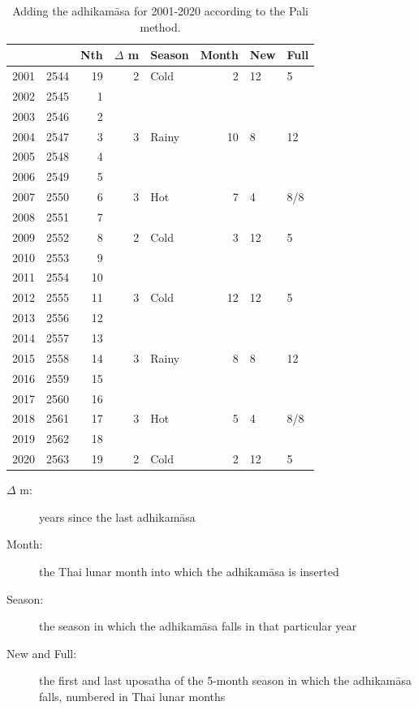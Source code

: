 \documentclass[11pt,oneside]{memoir-article}
\begin{document}
\begin{table}[h]
\caption{\label{tbl-adhikamasa-pali} Adding the adhikamāsa for 2001-2020 according to the Pali method.}
\centering
\begin{tabular}{rrrrlrll}
 &  & Nth & $\Delta$ m & Season & Month & New & Full\\
\hline
2001 & 2544 & 19 & 2 & Cold & 2 & \mN{} 12 & \mF{} 5\\
2002 & 2545 & 1 &  &  &  &  & \\
2003 & 2546 & 2 &  &  &  &  & \\
2004 & 2547 & 3 & 3 & Rainy & 10 & \mN{} 8 & \mF{} 12\\
2005 & 2548 & 4 &  &  &  &  & \\
2006 & 2549 & 5 &  &  &  &  & \\
2007 & 2550 & 6 & 3 & Hot & 7 & \mN{} 4 & \mF{} 8/8\\
2008 & 2551 & 7 &  &  &  &  & \\
2009 & 2552 & 8 & 2 & Cold & 3 & \mN{} 12 & \mF{} 5\\
2010 & 2553 & 9 &  &  &  &  & \\
2011 & 2554 & 10 &  &  &  &  & \\
2012 & 2555 & 11 & 3 & Cold & 12 & \mN{} 12 & \mF{} 5\\
2013 & 2556 & 12 &  &  &  &  & \\
2014 & 2557 & 13 &  &  &  &  & \\
2015 & 2558 & 14 & 3 & Rainy & 8 & \mN{} 8 & \mF{} 12\\
2016 & 2559 & 15 &  &  &  &  & \\
2017 & 2560 & 16 &  &  &  &  & \\
2018 & 2561 & 17 & 3 & Hot & 5 & \mN{} 4 & \mF{} 8/8\\
2019 & 2562 & 18 &  &  &  &  & \\
2020 & 2563 & 19 & 2 & Cold & 2 & \mN{} 12 & \mF{} 5\\
\end{tabular}
\end{table}

\begin{description}
\item[{$\Delta$ m:}] years since the last adhikamāsa
\item[{Month:}] the Thai lunar month into which the adhikamāsa is inserted
\item[{Season:}] the season in which the adhikamāsa falls in that particular year
\item[{New and Full:}] the first and last uposatha of the 5-month season in which
the adhikamāsa falls, numbered in Thai lunar months
\end{description}
\end{document}
